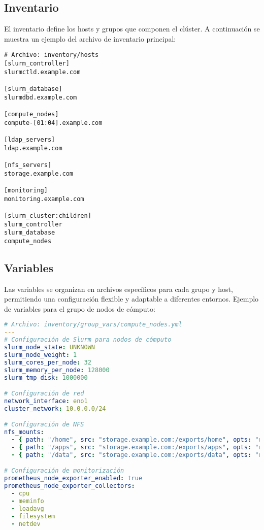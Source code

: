 \documentclass[12pt,a4paper]{report}
\begin{document}
\subsection{Inventario}

El inventario define los hosts y grupos que componen el clúster. A continuación se muestra un ejemplo del archivo de inventario principal:

\begin{lstlisting}
# Archivo: inventory/hosts
[slurm_controller]
slurmctld.example.com

[slurm_database]
slurmdbd.example.com

[compute_nodes]
compute-[01:04].example.com

[ldap_servers]
ldap.example.com

[nfs_servers]
storage.example.com

[monitoring]
monitoring.example.com

[slurm_cluster:children]
slurm_controller
slurm_database
compute_nodes
\end{lstlisting}

\subsection{Variables}

Las variables se organizan en archivos específicos para cada grupo y host, permitiendo una configuración flexible y adaptable a diferentes entornos. Ejemplo de variables para el grupo de nodos de cómputo:

\begin{lstlisting}[language=yaml]
# Archivo: inventory/group_vars/compute_nodes.yml
---
# Configuración de Slurm para nodos de cómputo
slurm_node_state: UNKNOWN
slurm_node_weight: 1
slurm_cores_per_node: 32
slurm_memory_per_node: 128000
slurm_tmp_disk: 1000000

# Configuración de red
network_interface: eno1
cluster_network: 10.0.0.0/24

# Configuración de NFS
nfs_mounts:
  - { path: "/home", src: "storage.example.com:/exports/home", opts: "rw,sync" }
  - { path: "/apps", src: "storage.example.com:/exports/apps", opts: "ro,sync" }
  - { path: "/data", src: "storage.example.com:/exports/data", opts: "rw,sync" }

# Configuración de monitorización
prometheus_node_exporter_enabled: true
prometheus_node_exporter_collectors:
  - cpu
  - meminfo
  - loadavg
  - filesystem
  - netdev
\end{lstlisting}
\end{document}
